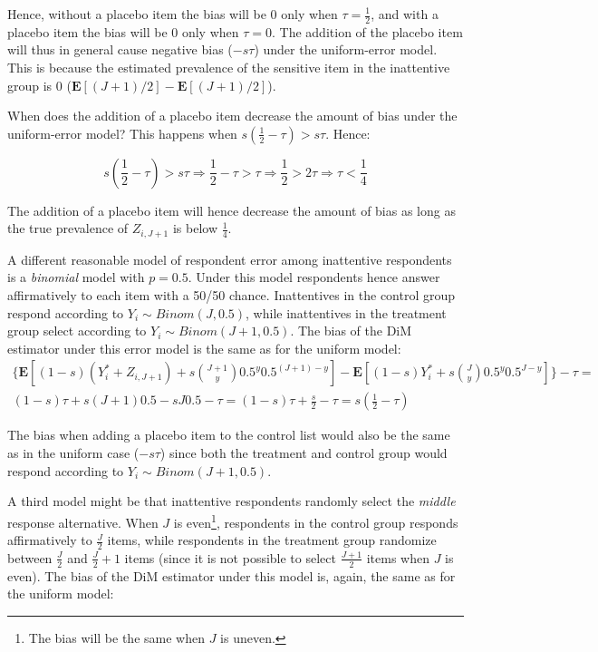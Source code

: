 \documentclass[]{article}
\let\rmarkdownfootnote\footnote%
\def\footnote{\protect\rmarkdownfootnote}
\begin{document}
Hence, without a placebo item the bias will be 0 only when
\(\tau = \frac{1}{2}\), and with a placebo item the bias will be 0 only
when \(\tau = 0\). The addition of the placebo item will thus in general
cause negative bias (\(-s \tau\)) under the uniform-error model. This is
because the estimated prevalence of the sensitive item in the
inattentive group is 0 (\(\mathbf{E}[(J+1)/2] - \mathbf{E}[(J+1)/2]\)).

When does the addition of a placebo item decrease the amount of bias
under the uniform-error model? This happens when
\(s \left(\frac{1}{2} - \tau \right) > s \tau\). Hence:

\[
s \left(\frac{1}{2} - \tau \right) > s \tau \Rightarrow \frac{1}{2} - \tau  > \tau \Rightarrow \frac{1}{2} > 2 \tau \Rightarrow \tau < \frac{1}{4}
\]

The addition of a placebo item will hence decrease the amount of bias as
long as the true prevalence of \(Z_{i, J+1}\) is below \(\frac{1}{4}\).

A different reasonable model of respondent error among inattentive
respondents is a \emph{binomial} model with \(p=0.5\). Under this model
respondents hence answer affirmatively to each item with a 50/50 chance.
Inattentives in the control group respond according to
\(Y_{i} \sim Binom(J, 0.5)\), while inattentives in the treatment group
select according to \(Y_{i} \sim Binom(J+1, 0.5)\). The bias of the DiM
estimator under this error model is the same as for the uniform model:
\[
\begin{aligned}
\bigg\{ \mathbf{E} \left[ (1-s)(Y^*_{i} + Z_{i, J+1}) + s {J+1 \choose y} 0.5^{y} 0.5^{(J+1)-y} \right] - \mathbf{E} \left[ (1-s)Y^*_{i} + s {J \choose y} 0.5^{y} 0.5^{J-y} \right] \bigg\} - \tau = \\
(1-s) \tau + s(J+1)0.5-sJ0.5 - \tau = (1-s) \tau + \frac{s}{2} - \tau =  s \left(\frac{1}{2} - \tau \right)
\end{aligned}
\]

The bias when adding a placebo item to the control list would also be
the same as in the uniform case (\(-s\tau\)) since both the treatment
and control group would respond according to
\(Y_{i} \sim Binom(J+1, 0.5)\).

A third model might be that inattentive respondents randomly select the
\emph{middle} response alternative. When \(J\) is even\footnote{The bias
  will be the same when \(J\) is uneven.}, respondents in the control
group responds affirmatively to \(\frac{J}{2}\) items, while respondents
in the treatment group randomize between \(\frac{J}{2}\) and
\(\frac{J}{2}+1\) items (since it is not possible to select
\(\frac{J+1}{2}\) items when \(J\) is even). The bias of the DiM
estimator under this model is, again, the same as for the uniform model:
\end{document}
